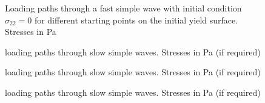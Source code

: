 \begin{figure}[h!]
  \centering
  \caption{Loading paths through a fast simple wave with initial condition $\sigma_{22}=0$ for different starting points on the initial yield surface. Stresses in Pa}
  \label{fig:fast_path_plane_strains}
\end{figure}


\begin{figure}[h!]
  \centering
  \caption{loading paths through slow simple waves. Stresses in Pa (if required)}
  \label{fig:slow_path_plane_strains}
\end{figure}

\begin{figure}[h!]
  \centering
  \caption{loading paths through slow simple waves. Stresses in Pa (if required)}
  \label{fig:slow_path_plane_strains}
\end{figure}


\begin{figure}[h!]
  \centering
  \caption{loading paths through slow simple waves. Stresses in Pa (if required)}
  \label{fig:slow_path_plane_strains}
\end{figure}





